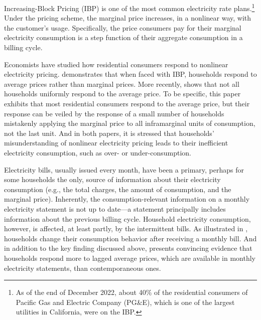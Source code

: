 Increasing-Block Pricing (IBP) is one of the most common electricity rate plans.\footnote{As of the end of December 2022, about 40\% of the residential consumers of Pacific Gas and Electric Company (PG\&E), which is one of the largest utilities in California, were on the IBP.} Under the pricing scheme, the marginal price increases, in a nonlinear way, with the customer's usage. Specifically, the price consumers pay for their marginal electricity consumption is a step function of their aggregate consumption in a billing cycle. 

Economists have studied how residential consumers respond to nonlinear electricity pricing. \cite{Do-Consumers-Respond-to-Marginal-or-Average-Price?-Evidence-from-Nonlinear-Electricity-Pricing_2014_(Ito)} demonstrates that when faced with IBP, households respond to average prices rather than marginal prices. More recently, \cite{Misunderstanding-Nonlinear-Prices_2020_(Shaffer)} shows that not all households uniformly respond to the average price. To be specific, this paper exhibits that most residential consumers respond to the average price, but their response can be veiled by the response of a small number of households mistakenly applying the marginal price to all inframarginal units of consumption, not the last unit. And in both papers, it is stressed that households' misunderstanding of nonlinear electricity pricing leads to their inefficient electricity consumption, such as over- or under-consumption.

Electricity bills, usually issued every month, have been a primary, perhaps for some households the only, source of information about their electricity consumption (e.g., the total charges, the amount of consumption, and the marginal price). Inherently, the consumption-relevant information on a monthly electricity statement is not up to date---a statement principally includes information about the previous billing cycle. Household electricity consumption, however, is affected, at least partly, by the intermittent bills. As illustrated in \cite{Dynamic-Salience-with-Intermittent-Billing_Gilbert-and-Zivin_2014}, households change their consumption behavior after receiving a monthly bill. And in addition to the key finding discussed above, \cite{Do-Consumers-Respond-to-Marginal-or-Average-Price?-Evidence-from-Nonlinear-Electricity-Pricing_2014_(Ito)} presents convincing evidence that households respond more to lagged average prices, which are available in monthly electricity statements, than contemporaneous ones. 

